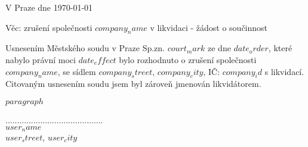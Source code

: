 \documentclass{../static/myletter}
\begin{document}
\begin{letter}{}
\opening{V Praze dne \today}
Věc: zrušení společnosti \textbf{$company_name$} v likvidaci - žádost o součinnost                  

Usnesením Městského soudu v Praze Sp.zn. $court_mark$ ze dne $date_order$, které nabylo právní moci $date_effect$ bylo rozhodnuto o zrušení společnosti $company_name$, se sídlem $company_street$, $company_city$, IČ: \textbf{$company_id$} s likvidací. Citovaným usnesením soudu jsem byl zároveň jmenován likvidátorem.  

$paragraph$

\hspace*{5cm}

\closing{..........................................\\ $user_name$ \\ $user_street$, $user_city$}
\end{letter}
\end{document}
